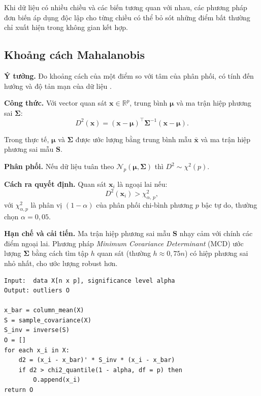\documentclass[11pt,a4paper]{article}
\newcommand{\R}{\mathbb{R}}
\begin{document}
Khi dữ liệu có nhiều chiều và các biến tương quan với nhau, các phương pháp đơn biến áp dụng độc lập cho từng chiều có thể bỏ sót những điểm bất thường chỉ xuất hiện trong không gian kết hợp.

\subsection{Khoảng cách Mahalanobis}

\textbf{Ý tưởng.} Đo khoảng cách của một điểm so với tâm của phân phối, có tính đến hướng và độ tản mạn của dữ liệu \parencite{mahalanobis1936}.

\textbf{Công thức.} Với vector quan sát $\mathbf{x} \in \R^p$, trung bình $\boldsymbol{\mu}$ và ma trận hiệp phương sai $\boldsymbol{\Sigma}$:
\begin{equation}
  D^2(\mathbf{x}) = (\mathbf{x} - \boldsymbol{\mu})^\top \boldsymbol{\Sigma}^{-1} (\mathbf{x} - \boldsymbol{\mu}).
\end{equation}

Trong thực tế, $\boldsymbol{\mu}$ và $\boldsymbol{\Sigma}$ được ước lượng bằng trung bình mẫu $\bar{\mathbf{x}}$ và ma trận hiệp phương sai mẫu $\mathbf{S}$.

\textbf{Phân phối.} Nếu dữ liệu tuân theo $\mathcal{N}_p(\boldsymbol{\mu}, \boldsymbol{\Sigma})$ thì $D^2 \sim \chi^2(p)$.

\textbf{Cách ra quyết định.} Quan sát $\mathbf{x}_i$ là ngoại lai nếu:
\begin{equation}
  D^2(\mathbf{x}_i) > \chi^2_{\alpha,\,p},
\end{equation}
với $\chi^2_{\alpha,p}$ là phân vị $(1-\alpha)$ của phân phối chi-bình phương $p$ bậc tự do, thường chọn $\alpha = 0{,}05$.

\textbf{Hạn chế và cải tiến.} Ma trận hiệp phương sai mẫu $\mathbf{S}$ nhạy cảm với chính các điểm ngoại lai.
Phương pháp \textit{Minimum Covariance Determinant} (MCD) \parencite{rousseeuw1999} ước lượng $\boldsymbol{\Sigma}$ bằng cách tìm tập $h$ quan sát (thường $h \approx 0{,}75n$) có hiệp phương sai nhỏ nhất, cho ước lượng robust hơn.

\begin{lstlisting}[style=pseudo, caption={Khoảng cách Mahalanobis}, label={lst:mahal}]
Input:  data X[n x p], significance level alpha
Output: outliers O

x_bar = column_mean(X)
S = sample_covariance(X)
S_inv = inverse(S)
O = []
for each x_i in X:
    d2 = (x_i - x_bar)' * S_inv * (x_i - x_bar)
    if d2 > chi2_quantile(1 - alpha, df = p) then
        O.append(x_i)
return O
\end{lstlisting}
\end{document}
